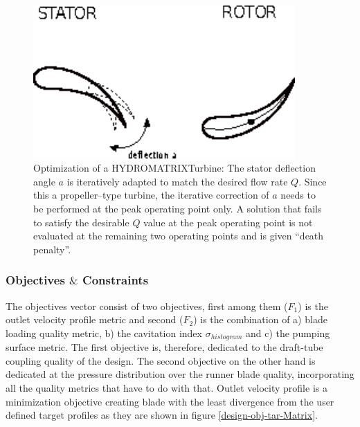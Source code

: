 \begin{figure}[h!]
\centering
\includegraphics[width=100mm]{stator.eps}    
\caption{Optimization of a HYDROMATRIX\circledR Turbine: 
The stator deflection angle $a$ is iteratively adapted to match the desired flow rate $Q$. Since this a propeller--type turbine, the iterative correction of $a$ needs to be performed at the peak operating point only. A solution that fails to satisfy the desirable $Q$ value at the peak operating point is not evaluated at the remaining two operating points and is given ``death penalty''.}
\label{Matrix_stator}
\end{figure}

\subsubsection{Objectives $\&$ Constraints}

The objectives vector consist of two objectives, first among them ($F_1$) is the outlet velocity profile metric and second ($F_2$) is the combination of a) blade loading quality metric, b) the cavitation index $\sigma_{histogram}$ and c) the pumping surface metric. The first objective is, therefore, dedicated to the draft-tube coupling quality of the design. The second objective on the other hand is dedicated at the pressure distribution over the runner blade quality, incorporating all the quality metrics that have to do with that. Outlet velocity profile is  a minimization objective creating blade with the least divergence from the user defined target profiles as they are shown in figure \ref{design-obj-tar-Matrix}. 

